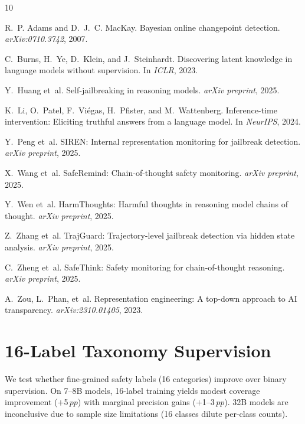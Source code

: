 \documentclass[11pt,a4paper]{article}
\newcommand{\pp}{\,pp}
\begin{document}
\begin{thebibliography}{10}

R.~P. Adams and D.~J.~C. MacKay.
Bayesian online changepoint detection.
{\em arXiv:0710.3742}, 2007.

C.~Burns, H.~Ye, D.~Klein, and J.~Steinhardt.
Discovering latent knowledge in language models without supervision.
In {\em ICLR}, 2023.

Y.~Huang et~al.
Self-jailbreaking in reasoning models.
{\em arXiv preprint}, 2025.

K.~Li, O.~Patel, F.~Vi\'{e}gas, H.~Pfister, and M.~Wattenberg.
Inference-time intervention: Eliciting truthful answers from a language model.
In {\em NeurIPS}, 2024.

Y.~Peng et~al.
{SIREN}: Internal representation monitoring for jailbreak detection.
{\em arXiv preprint}, 2025.

X.~Wang et~al.
{SafeRemind}: Chain-of-thought safety monitoring.
{\em arXiv preprint}, 2025.

Y.~Wen et~al.
{HarmThoughts}: Harmful thoughts in reasoning model chains of thought.
{\em arXiv preprint}, 2025.

Z.~Zhang et~al.
{TrajGuard}: Trajectory-level jailbreak detection via hidden state analysis.
{\em arXiv preprint}, 2025.

C.~Zheng et~al.
{SafeThink}: Safety monitoring for chain-of-thought reasoning.
{\em arXiv preprint}, 2025.

A.~Zou, L.~Phan, et~al.
Representation engineering: A top-down approach to {AI} transparency.
{\em arXiv:2310.01405}, 2023.

\end{thebibliography}

\appendix
\section{16-Label Taxonomy Supervision}
\label{app:taxonomy}

We test whether fine-grained safety labels (16 categories) improve over binary supervision.
On 7--8B models, 16-label training yields modest coverage improvement ($+$5$\pp$) with marginal precision gains ($+$1--3$\pp$).
32B models are inconclusive due to sample size limitations (16 classes dilute per-class counts).
\end{document}
